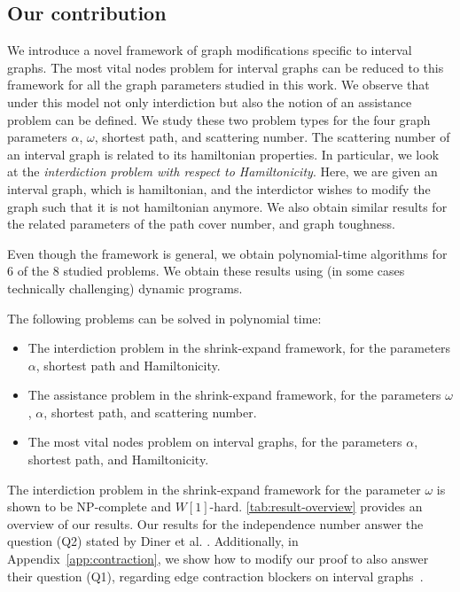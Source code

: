 
\subsection{Our contribution} 
We introduce a novel framework of graph modifications  
specific to interval graphs. The most vital nodes problem for interval graphs can be reduced to  this framework for all the graph parameters studied in this work. We observe that under this model not only interdiction but also the 
notion of an assistance problem can be defined. 
We study these two problem types for the four graph parameters $\alpha$, $\omega$, shortest path, and scattering number. The scattering number of an interval graph is related to its hamiltonian properties. In particular, we look at the \emph{interdiction problem with respect to Hamiltonicity}. Here, we are given an interval graph, which is hamiltonian, and the interdictor wishes to modify the graph such that it is not hamiltonian anymore.
We also obtain similar results for the related parameters of the path cover number, and graph toughness.

Even though the framework is general, we obtain polynomial-time algorithms
for 6 of the 8 studied problems. We obtain these results using (in some cases technically challenging) dynamic programs. 

\begin{theorem}
The following problems can be solved in polynomial time:
\begin{itemize}
\item The interdiction problem in the shrink-expand framework, for the parameters $\alpha$,  shortest path and Hamiltonicity.
\item The assistance problem in the shrink-expand framework, for the parameters $\omega$, $\alpha$, shortest path, and scattering number.
\item The most vital nodes problem on interval graphs, for the parameters $\alpha$, shortest path, and Hamiltonicity.
\end{itemize}
\end{theorem}

The interdiction problem in the shrink-expand framework for the parameter $\omega$ is shown to be NP-complete and $W[1]$-hard. \cref{tab:result-overview} provides an overview of our results. 
Our results for the independence number answer the question (Q2) stated by Diner et al. \cite[(Q2)]{diner2018contractionDeletionBlockers}. Additionally, in Appendix~\ref{app:contraction}, we show how to modify our proof to also answer their question (Q1), regarding edge contraction blockers on interval graphs~\cite[(Q1)]{diner2018contractionDeletionBlockers}.


